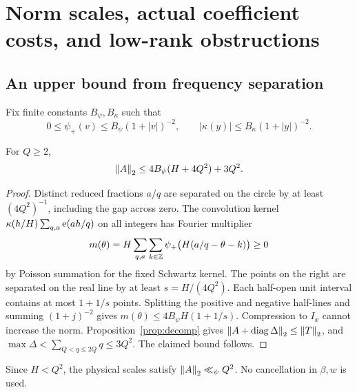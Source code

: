 \section{Norm scales, actual coefficient costs, and low-rank obstructions}\label{sec:barriers}
\subsection{An upper bound from frequency separation}
Fix finite constants $B_\psi,B_\kappa$ such that
\[
0\le\psi_+(v)\le B_\psi(1+|v|)^{-2},\qquad
|\kappa(y)|\le B_\kappa(1+|y|)^{-2}.
\]
\begin{lemma}\label{lem:upper}
For $Q\ge2$,
\[
\left\|A\right\|_2\le4B_\psi(H+4Q^2)+3Q^2.
\]
\end{lemma}
\begin{proof}
Distinct reduced fractions $a/q$ are separated on the circle by at least $(4Q^2)^{-1}$, including the gap across zero. The convolution kernel
$\kappa(h/H)\sum_{q,a}\mathrm e(ah/q)$ on all integers has Fourier multiplier
\[
m(\theta)=H\sum_{q,a}\sum_{k\in\mathbb Z}\psi_+\big(H(a/q-\theta-k)\big)\ge0
\]
by Poisson summation for the fixed Schwartz kernel. The points on the right are separated on the real line by at least $s=H/(4Q^2)$. Each half-open unit interval contains at most $1+1/s$ points. Splitting the positive and negative half-lines and summing $(1+j)^{-2}$ gives
$m(\theta)\le4B_\psi H(1+1/s)$.
Compression to $I_x$ cannot increase the norm. Proposition~\ref{prop:decomp} gives $\left\|A+\operatorname{diag}\Delta\right\|_2\le\left\|T\right\|_2$, and
$\max\Delta<\sum_{Q<q\le2Q}q\le3Q^2$. The claimed bound follows.
\end{proof}
Since $H<Q^2$, the physical scales satisfy $\left\|A\right\|_2\ll_\psi Q^2$. No cancellation in $\beta,w$ is used.

